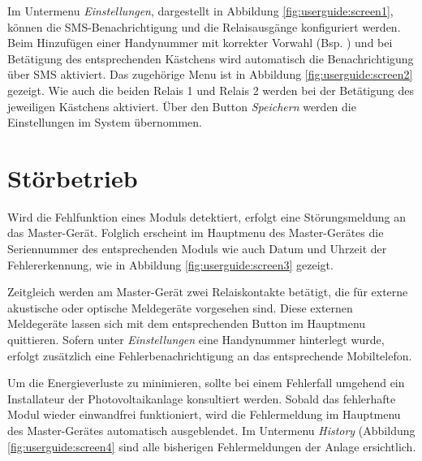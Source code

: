 Im     Untermenu     \emph{Einstellungen},    dargestellt     in     Abbildung
\ref{fig:userguide:screen1},   k\"onnen  die   SMS-Benachrichtigung  und   die
Relaisausg\"ange konfiguriert werden. Beim  Hinzuf\"ugen einer Handynummer mit
korrekter Vorwahl  (Bsp. ) und bei  Bet\"atigung des
entsprechenden K\"astchens   wird automatisch die Benachrichtigung  \"uber SMS
aktiviert. Das zugeh\"orige Menu  ist in Abbildung \ref{fig:userguide:screen2}
gezeigt. Wie auch die beiden Relais 1 und Relais 2 werden bei der Bet\"atigung
des jeweiligen K\"astchens aktiviert. \"Uber den Button \emph{Speichern} werden
die Einstellungen im System \"ubernommen.


\section{St\"orbetrieb}
\label{sec:userguide:errors}

Wird die Fehlfunktion eines  Moduls detektiert, erfolgt eine St\"orungsmeldung
an das  Master-Ger\"at. Folglich erscheint  im Hauptmenu  des Master-Ger\"ates
die  Seriennummer des  entsprechenden Moduls  wie auch  Datum und  Uhrzeit der
Fehlererkennung, wie in Abbildung \ref{fig:userguide:screen3} gezeigt.

Zeitgleich  werden  am  Master-Ger\"at  zwei  Relaiskontakte  bet\"atigt,  die
f\"ur externe  akustische oder  optische Meldeger\"ate  vorgesehen sind. Diese
externen Meldeger\"ate lassen sich mit  dem entsprechenden Button im Hauptmenu
quittieren. Sofern  unter  \emph{Einstellungen}  eine  Handynummer  hinterlegt
wurde, erfolgt  zus\"atzlich eine Fehlerbenachrichtigung an  das entsprechende
Mobiltelefon.

Um die Energieverluste zu minimieren, sollte bei einem Fehlerfall umgehend ein
Installateur der Photovoltaikanlage konsultiert werden. Sobald das fehlerhafte
Modul  wieder einwandfrei  funktioniert, wird  die Fehlermeldung  im Hauptmenu
des  Master-Ger\"ates  automatisch ausgeblendet. Im  Untermenu  \emph{History}
(Abbildung  \ref{fig:userguide:screen4} sind  alle bisherigen  Fehlermeldungen
der Anlage ersichtlich.


